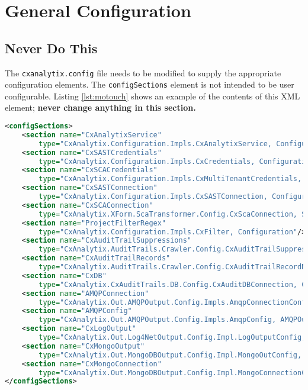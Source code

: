 \section{General Configuration}\label{sec:general}

\subsection{Never Do This}

The \texttt{cxanalytix.config} file needs to be modified to supply the appropriate configuration elements.  The \texttt{configSections}
element is not intended to be user configurable.  Listing \ref{lst:motouch} shows an example of the contents of this XML element;
\textbf{never change anything in this section.}

\begin{lstlisting}[caption={Part of the Configuration File to Never Change}, label={lst:motouch}, language=XML, basicstyle=\ttfamily\tiny]
<configSections>
    <section name="CxAnalytixService" 
        type="CxAnalytix.Configuration.Impls.CxAnalytixService, Configuration" />
    <section name="CxSASTCredentials" 
        type="CxAnalytix.Configuration.Impls.CxCredentials, Configuration" />
    <section name="CxSCACredentials" 
        type="CxAnalytix.Configuration.Impls.CxMultiTenantCredentials, Configuration" />
    <section name="CxSASTConnection" 
        type="CxAnalytix.Configuration.Impls.CxSASTConnection, Configuration" />
    <section name="CxSCAConnection" 
        type="CxAnalytix.XForm.ScaTransformer.Config.CxScaConnection, ScaTransformer" />
    <section name="ProjectFilterRegex" 
        type="CxAnalytix.Configuration.Impls.CxFilter, Configuration"/>
    <section name="CxAuditTrailSuppressions" 
        type="CxAnalytix.AuditTrails.Crawler.Config.CxAuditTrailSuppressions, CxAuditTrailsCrawler"/>
    <section name="CxAuditTrailRecords" 
        type="CxAnalytix.AuditTrails.Crawler.Config.CxAuditTrailRecordNameMap, CxAuditTrailsCrawler"/>
    <section name="CxDB" 
        type="CxAnalytix.CxAuditTrails.DB.Config.CxAuditDBConnection, CxAuditTrailsDB"/>
    <section name="AMQPConnection" 
        type="CxAnalytix.Out.AMQPOutput.Config.Impls.AmqpConnectionConfig, AMQPOutput"/>
    <section name="AMQPConfig" 
        type="CxAnalytix.Out.AMQPOutput.Config.Impls.AmqpConfig, AMQPOutput"/>
    <section name="CxLogOutput" 
        type="CxAnalytix.Out.Log4NetOutput.Config.Impl.LogOutputConfig, Log4NetOutput" />
    <section name="CxMongoOutput" 
        type="CxAnalytix.Out.MongoDBOutput.Config.Impl.MongoOutConfig, MongoDBOutput" />
    <section name="CxMongoConnection" 
        type="CxAnalytix.Out.MongoDBOutput.Config.Impl.MongoConnectionConfig, MongoDBOutput" />
</configSections>
\end{lstlisting}

